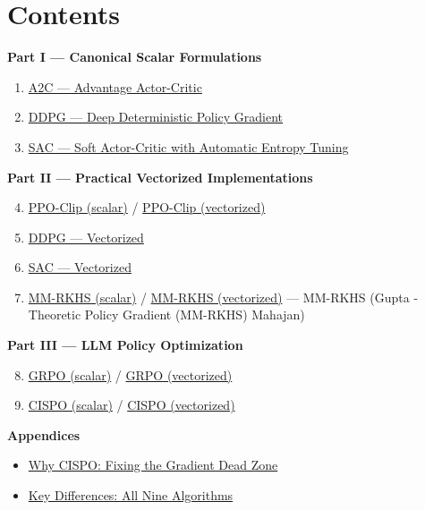 \documentclass[11pt]{article}
\begin{document}
\section*{Contents}

\textbf{Part I --- Canonical Scalar Formulations}
\begin{enumerate}
\item \hyperref[alg:a2c]{A2C --- Advantage Actor-Critic}
\item \hyperref[alg:ddpg-scalar]{DDPG --- Deep Deterministic Policy Gradient}
\item \hyperref[alg:sac-scalar]{SAC --- Soft Actor-Critic with Automatic Entropy Tuning}
\end{enumerate}

\textbf{Part II --- Practical Vectorized Implementations}
\begin{enumerate}\setcounter{enumi}{3}
\item \hyperref[alg:ppo]{PPO-Clip (scalar)} / \hyperref[alg:ppo-practical]{PPO-Clip (vectorized)}
\item \hyperref[alg:ddpg]{DDPG --- Vectorized}
\item \hyperref[alg:sac]{SAC --- Vectorized}
\item \hyperref[alg:mmrkhs]{MM-RKHS (scalar)} / \hyperref[alg:mmrkhs-practical]{MM-RKHS (vectorized)} --- MM-RKHS (Gupta \Operator-Theoretic Policy Gradient (MM-RKHS) Mahajan)
\end{enumerate}

\textbf{Part III --- LLM Policy Optimization}
\begin{enumerate}\setcounter{enumi}{7}
\item \hyperref[alg:grpo]{GRPO (scalar)} / \hyperref[alg:grpo-practical]{GRPO (vectorized)}
\item \hyperref[alg:cispo]{CISPO (scalar)} / \hyperref[alg:cispo-practical]{CISPO (vectorized)}
\end{enumerate}

\textbf{Appendices}
\begin{itemize}
\item \hyperref[alg:cispo]{Why CISPO: Fixing the Gradient Dead Zone}
\item \hyperref[alg:compare]{Key Differences: All Nine Algorithms}
\end{itemize}

\clearpage
\end{document}
